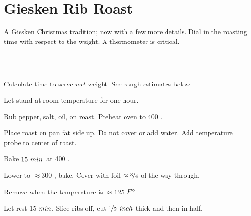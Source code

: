 \section[Rib Roast]{Giesken Rib Roast}


\begin{recipestats}[
	servings=\onehalf~\pound/person,
	preptime=1\onehalf~\hour,
	bakingtime=$\approx4~\hour$,
	inactivetime=1\onehalf~\hour,
	source=Giesken~Family,
]
\end{recipestats}


\begin{recipeabstract}
	A Giesken Christmas tradition; now with a few more details.
	Dial in the roasting time with respect to the weight.
	A thermometer is critical.
\end{recipeabstract}


\begin{ingredientcolumns}[1]
	\begin{ingredientblock}
		\\
		\\
	\end{ingredientblock}
\end{ingredientcolumns}


\begin{preparation}
\item Calculate time to serve $wrt$ weight.
	See rough estimates below.

\item Let stand at room temperature for one hour.

\item Rub pepper, salt, oil, on roast. Preheat oven to $400$ \Fahrenheit.

\item Place roast on pan fat side up.
	Do not cover or add water.
	Add temperature probe to center of roast.

\item Bake $15~\minute$~at 400 \Fahrenheit.

\item Lower to $\approx 300$ \Fahrenheit, bake.
	Cover with foil $\approx \threefourth$ of the way through.

\item Remove when the temperature is $\approx 125$ $\Fahrenheit$.

\item Let rest 15 $\minute$.
	Slice ribs off, cut $\onehalf$ $\inch$ thick and then in half.

\end{preparation}


